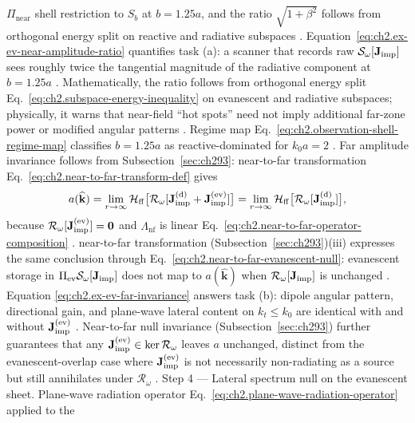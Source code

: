 $\Pi_{\mathrm{near}}$ shell restriction to $S_b$ at $b=1.25a$, and the ratio
$\sqrt{1+\beta^{2}}$ follows from orthogonal energy split on reactive and radiative subspaces
\cite{stratton1941}. Equation~\eqref{eq:ch2.ex-ev-near-amplitude-ratio} quantifies task (a): a
scanner that records raw $\mathcal{S}_\omega[\mathbf{J}_{\mathrm{imp}}]$ sees roughly twice the tangential magnitude
of the radiative component at $b=1.25a$ \cite{stratton1941}. Mathematically, the ratio follows
from orthogonal energy split Eq.~\eqref{eq:ch2.subspace-energy-inequality} on evanescent and
radiative subspaces; physically, it warns that near-field ``hot spots'' need not imply additional
far-zone power or modified angular patterns \cite{harrington2001}. Regime map
Eq.~\eqref{eq:ch2.observation-shell-regime-map} classifies \(b=1.25a\) as reactive-dominated for
\(k_0 a=2\) \cite{stratton1941}.
Far amplitude invariance follows from Subsection~\ref{sec:ch293}: near-to-far transformation Eq.~\eqref{eq:ch2.near-to-far-transform-def} gives
\begin{equation}
\label{eq:ch2.ex-ev-far-invariance}
a(\widehat{\mathbf{k}})
=
\lim_{r\to\infty}
\mathcal{H}_{\mathrm{ff}}\big[\mathcal{R}_\omega[\mathbf{J}_{\mathrm{imp}}^{(\mathrm{d})}+\mathbf{J}_{\mathrm{imp}}^{(\mathrm{ev})}]\big]
=
\lim_{r\to\infty}
\mathcal{H}_{\mathrm{ff}}\big[\mathcal{R}_\omega[\mathbf{J}_{\mathrm{imp}}^{(\mathrm{d})}]\big],
\end{equation}
because \(\mathcal{R}_\omega[\mathbf{J}_{\mathrm{imp}}^{(\mathrm{ev})}]=\mathbf{0}\) and \(\Lambda_{\mathrm{nf}}\) is
linear Eq.~\eqref{eq:ch2.near-to-far-operator-composition} \cite{stratton1941}.
near-to-far transformation (Subsection~\ref{sec:ch293})(iii) expresses the same conclusion through
Eq.~\eqref{eq:ch2.near-to-far-evanescent-null}: evanescent storage in
\(\Pi_{\mathrm{ev}}\mathcal{S}_\omega[\mathbf{J}_{\mathrm{imp}}]\) does not map to \(a(\widehat{\mathbf{k}})\) when
\(\mathcal{R}_\omega[\mathbf{J}_{\mathrm{imp}}]\) is unchanged \cite{stratton1941}. Equation
\eqref{eq:ch2.ex-ev-far-invariance} answers task (b): dipole angular pattern, directional gain, and
plane-wave lateral content on \(k_t\le k_0\) are identical with and without
\(\mathbf{J}_{\mathrm{imp}}^{(\mathrm{ev})}\) \cite{jackson1999}. Near-to-far null invariance (Subsection~\ref{sec:ch293}) further guarantees that any
\(\mathbf{J}_{\mathrm{imp}}^{(\mathrm{ev})}\in\ker\mathcal{R}_\omega\) leaves \(a\) unchanged, distinct from the
evanescent-overlap case where \(\mathbf{J}_{\mathrm{imp}}^{(\mathrm{ev})}\) is not necessarily non-radiating as a
source but still annihilates under \(\mathcal{R}_\omega\) \cite{stratton1941}.
Step 4 — Lateral spectrum null on the evanescent sheet. Plane-wave radiation operator Eq.~\eqref{eq:ch2.plane-wave-radiation-operator} applied to the
